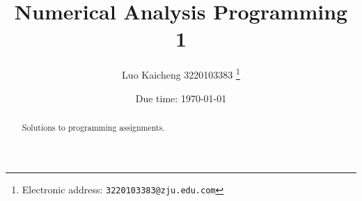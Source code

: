 \documentclass[a4paper]{article}
\begin{document}
\title{Numerical Analysis Programming 1}

\author{Luo Kaicheng 3220103383
  \thanks{Electronic address: \texttt{3220103383@zju.edu.com}}}

\date{Due time: \today}

\maketitle

\begin{abstract}
    Solutions to programming assignments.
\end{abstract}

\end{document}
